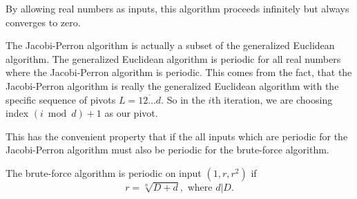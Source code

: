 By allowing real numbers as inputs, this algorithm proceeds infinitely but
always converges to zero.

The Jacobi-Perron algorithm is actually a subset of the generalized Euclidean algorithm.
The generalized Euclidean algorithm is periodic for all real numbers where the Jacobi-Perron algorithm is periodic.
This comes from the fact, that the Jacobi-Perron algorithm is really the
generalized Euclidean algorithm with the specific sequence of pivots $L = \overline{12…d}$.
So in the $i$th iteration, we are choosing index $(i \bmod d) + 1$ as our pivot.

This has the convenient property that if the all inputs which are periodic for
the Jacobi-Perron algorithm must also be periodic for the brute-force algorithm.

\begin{theorem}
  The brute-force algorithm is periodic on input $(1, r, r^2)$ if
  \[
    r = \sqrt[n]{D + d}, \text{ where } d | D.
  \]
\end{theorem}

